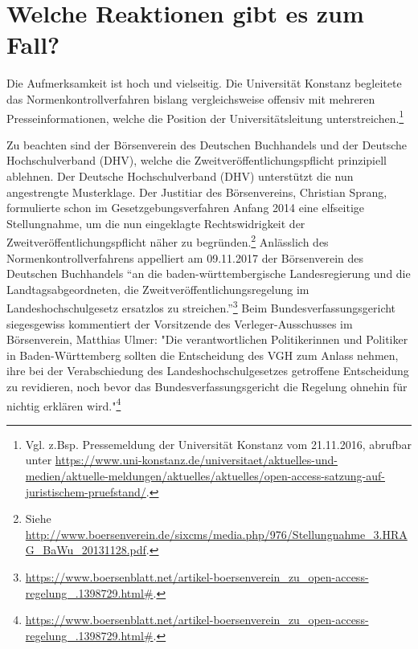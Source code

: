 \documentclass[a4paper,
fontsize=11pt,
oneside,
numbers=noperiodatend,
parskip=half-,
bibliography=totoc,
final
]{scrartcl}
\begin{document}
\hypertarget{welche-reaktionen-gibt-es-zum-fall}{%
\section*{Welche Reaktionen gibt es zum
Fall?}\label{welche-reaktionen-gibt-es-zum-fall}}

Die Aufmerksamkeit ist hoch und vielseitig. Die Universität Konstanz
begleitete das Normenkontrollverfahren bislang vergleichsweise offensiv
mit mehreren Presseinformationen, welche die Position der
Universitätsleitung unterstreichen.\footnote{Vgl. z.Bsp. Pressemeldung
  der Universität Konstanz vom 21.11.2016, abrufbar unter
  \url{https://www.uni-konstanz.de/universitaet/aktuelles-und-medien/aktuelle-meldungen/aktuelles/aktuelles/open-access-satzung-auf-juristischem-pruefstand/}.}

Zu beachten sind der Börsenverein des Deutschen Buchhandels und der
Deutsche Hochschulverband (DHV), welche die
Zweit\-ver\-öffent\-lich\-ungs\-pflicht prinzipiell ablehnen. Der Deutsche
Hochschulverband (DHV) unterstützt die nun angestrengte Musterklage. Der
Justitiar des Börsenvereins, Christian Sprang, formulierte schon im
Gesetzgebungsverfahren Anfang 2014 eine elfseitige Stellungnahme, um die
nun eingeklagte Rechtswidrigkeit der Zweit\-ver\-öffent\-lich\-ungs\-pflicht näher
zu begründen.\footnote{Siehe
  \url{http://www.boersenverein.de/sixcms/media.php/976/Stellungnahme_3.HRAG_BaWu_20131128.pdf}.}
Anlässlich des Normenkontrollverfahrens appelliert am 09.11.2017 der
Börsenverein des Deutschen Buchhandels \enquote{an die
baden-württembergische Landesregierung und die Landtagsabgeordneten, die
Zweit\-ver\-öffent\-lich\-ungs\-regelung im Landeshochschulgesetz ersatzlos zu
streichen.}\footnote{\href{https://www.boersenblatt.net/artikel-boersenverein_zu_open-access-regelung_.1398729.html}{https://www.boersenblatt.net/artikel-boersenverein\_zu\_open-access-regelung\_.1398729.html\#}.}
Beim Bundesverfassungsgericht siegesgewiss kommentiert der Vorsitzende
des Verleger-Ausschusses im Börsenverein, Matthias Ulmer: "Die
verantwortlichen Politikerinnen und Politiker in Baden-Württemberg
sollten die Entscheidung des VGH zum Anlass nehmen, ihre bei der
Verabschiedung des Landeshochschulgesetzes getroffene Entscheidung zu
revidieren, noch bevor das Bundesverfassungsgericht die Regelung ohnehin
für nichtig erklären wird."\footnote{\href{https://www.boersenblatt.net/artikel-boersenverein_zu_open-access-regelung_.1398729.html}{https://www.boersenblatt.net/artikel-boersenverein\_zu\_open-access-regelung\_.1398729.html\#}.}
\end{document}
